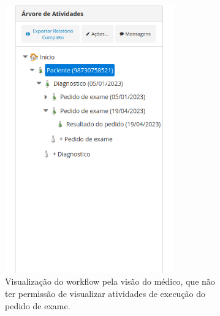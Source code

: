 \begin{figure}
    \centering

    \begin{subfigure}[b]{0.45\textwidth}
        \centering
        \includegraphics[width=0.8\textwidth]{imgs/Exemplo-Mestrado/arvore_medico.png}
        \caption{Visualização do workflow pela visão do médico, que não ter permissão de visualizar atividades de execução do pedido de exame.}
        \label{fig:arvore_medico}
    \end{subfigure}
    \hfill
    \begin{subfigure}[b]{0.45\textwidth}
        \centering

\end{subfigure}
\end{figure}
